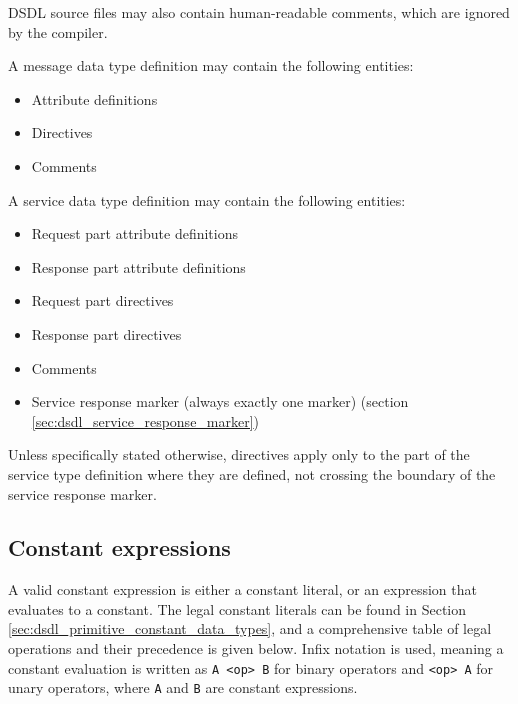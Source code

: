 DSDL source files may also contain human-readable comments, which are ignored by the compiler.

A message data type definition may contain the following entities:

\begin{itemize}
    \item Attribute definitions
    \item Directives
    \item Comments
\end{itemize}

A service data type definition may contain the following entities:

\begin{itemize}
    \item Request part attribute definitions
    \item Response part attribute definitions
    \item Request part directives
    \item Response part directives
    \item Comments
    \item Service response marker (always exactly one marker) (section \ref{sec:dsdl_service_response_marker})
\end{itemize}

Unless specifically stated otherwise,
directives apply only to the part of the service type definition where they are defined,
not crossing the boundary of the service response marker.


\subsection{Constant expressions}\label{sec:dsdl_constant_expressions}
A valid constant expression is either a constant literal, or an expression that evaluates to a constant.
The legal constant literals can be found in Section \ref{sec:dsdl_primitive_constant_data_types},
and a comprehensive table of legal operations and their precedence is given below.
Infix notation is used, meaning a constant evaluation is written as \texttt{A <op> B} for 
binary operators and \texttt{<op> A} for unary operators, where \texttt{A} and \texttt{B} are constant expressions.

